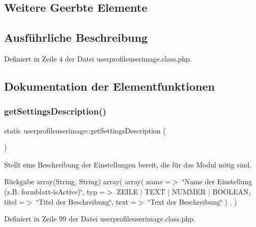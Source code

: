 \subsection*{Weitere Geerbte Elemente}


\subsection{Ausführliche Beschreibung}


Definiert in Zeile 4 der Datei userprofileuserimage.\+class.\+php.



\subsection{Dokumentation der Elementfunktionen}
\mbox{\label{classuserprofileuserimage_aa5c8eadea0a2ad16a471d96e265d0d39}} 
\subsubsection{\texorpdfstring{get\+Settings\+Description()}{getSettingsDescription()}}
{\footnotesize\ttfamily static userprofileuserimage\+::get\+Settings\+Description (\begin{DoxyParamCaption}{ }\end{DoxyParamCaption})\hspace{0.3cm}{\ttfamily [static]}}

Stellt eine Beschreibung der Einstellungen bereit, die für das Modul nötig sind. \begin{DoxyReturn}{Rückgabe}
array(\+String, String) array( array( \textquotesingle{}name\textquotesingle{} =$>$ \char`\"{}\+Name der Einstellung (z.\+B. formblatt-\/is\+Active)\char`\"{}, \textquotesingle{}typ\textquotesingle{} =$>$ Z\+E\+I\+LE $\vert$ T\+E\+XT $\vert$ N\+U\+M\+M\+ER $\vert$ B\+O\+O\+L\+E\+AN, \textquotesingle{}titel\textquotesingle{} =$>$ \char`\"{}\+Titel der Beschreibung\char`\"{}, \textquotesingle{}text\textquotesingle{} =$>$ \char`\"{}\+Text der Beschreibung\char`\"{} ) , ) 
\end{DoxyReturn}


Definiert in Zeile 99 der Datei userprofileuserimage.\+class.\+php.

